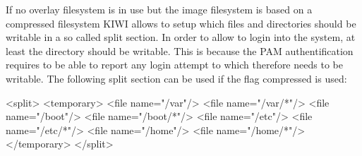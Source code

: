 If no overlay filesystem is in use but the image filesystem is based on
a compressed filesystem KIWI allows to setup which files and directories
should be writable in a so called split section. In order to allow to
login into the system, at least the  directory should be writable.
This is because the PAM authentification requires to be able to report any login
attempt to  which therefore needs to be writable. The
following split section can be used if the flag compressed is used:

\begin{xml}
<split>
   <temporary>
       <file name="/var"/>
       <file name="/var/*"/>
       <file name="/boot"/>
       <file name="/boot/*"/>
       <file name="/etc"/>
       <file name="/etc/*"/>
       <file name="/home"/>
       <file name="/home/*"/>
   </temporary>
</split>
\end{xml}

